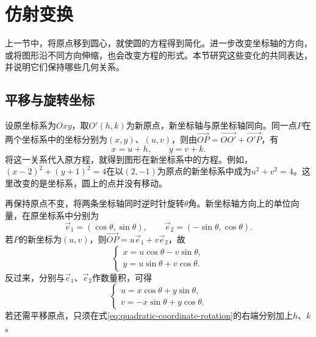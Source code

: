 ﻿\newpage
\section{仿射变换}
\label{sec:quadratic-affine-transformations}

上一节中，将原点移到圆心，就使圆的方程得到简化。进一步改变坐标轴的方向，或将图形沿不同方向伸缩，也会改变方程的形式。本节研究这些变化的共同表达，并说明它们保持哪些几何关系。

\subsection{平移与旋转坐标}
\label{subsec:quadratic-translation-and-rotation}

设原坐标系为\(Oxy\)，取\(O'(h,k)\)为新原点，新坐标轴与原坐标轴同向。同一点\(P\)在两个坐标系中的坐标分别为\((x,y)\)、\((u,v)\)，则由\(\overrightarrow{OP}=\overrightarrow{OO'}+\overrightarrow{O'P}\)，有
\begin{equation}\label{eq:quadratic-coordinate-translation}
    x=u+h , \qquad y=v+k .
\end{equation}
将这一关系代入原方程，就得到图形在新坐标系中的方程。例如，\((x-2)^2+(y+1)^2=4\)在以\((2,-1)\)为原点的新坐标系中成为\(u^2+v^2=4\)。这里改变的是坐标系，圆上的点并没有移动。

再保持原点不变，将两条坐标轴同时逆时针旋转\(\theta\)角。新坐标轴方向上的单位向量，在原坐标系中分别为
\begin{equation*}
    \vec e_1=(\cos\theta,\sin\theta) , \qquad
    \vec e_2=(-\sin\theta,\cos\theta) .
\end{equation*}
若\(P\)的新坐标为\((u,v)\)，则\(\overrightarrow{OP}=u\vec e_1+v\vec e_2\)，故
\begin{equation}\label{eq:quadratic-coordinate-rotation}
    \begin{cases}
        x=u\cos\theta-v\sin\theta ,\\
        y=u\sin\theta+v\cos\theta .
    \end{cases}
\end{equation}
反过来，分别与\(\vec e_1\)、\(\vec e_2\)作数量积，可得
\begin{equation}\label{eq:quadratic-coordinate-rotation-inverse}
    \begin{cases}
        u=x\cos\theta+y\sin\theta ,\\
        v=-x\sin\theta+y\cos\theta .
    \end{cases}
\end{equation}
若还需平移原点，只须在式\eqref{eq:quadratic-coordinate-rotation}的右端分别加上\(h\)、\(k\)。

